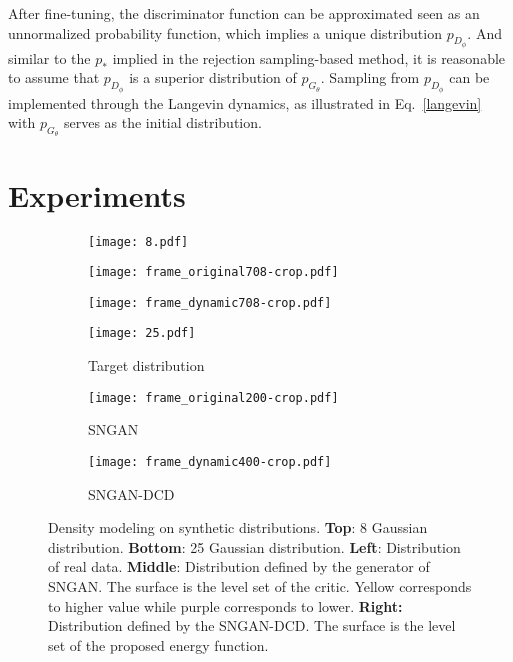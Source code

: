 \documentclass{article}
\begin{document}
After fine-tuning, the discriminator function can be approximated seen as an unnormalized probability function, which implies a unique distribution $p_{D_\phi}$. And similar to the $p_{*}$ implied in the rejection sampling-based method, it is reasonable to assume that $p_{D_\phi}$ is a superior distribution of $p_{G_\theta}$. Sampling from $p_{D_\phi}$ can be implemented through the Langevin dynamics, as illustrated in Eq.~\ref{langevin} with $p_{G_\theta}$ serves as the initial distribution.  


\section{Experiments}

\begin{figure*}[!t]
	\centering
	\begin{subfigure}{0.32\linewidth}
    	\texttt{[image: 8.pdf]} 
    \end{subfigure}
    \begin{subfigure}{0.32\linewidth}
		\texttt{[image: frame\_original708-crop.pdf]}
    \end{subfigure}
    \begin{subfigure}{0.32\linewidth}
		\texttt{[image: frame\_dynamic708-crop.pdf]}
    \end{subfigure}
    \begin{subfigure}{0.32\linewidth}
		\texttt{[image: 25.pdf]} 
        \caption{Target distribution}
        \label{subfig:toy:true}
    \end{subfigure}
    \begin{subfigure}{0.32\linewidth}
		\texttt{[image: frame\_original200-crop.pdf]}
        \caption{SNGAN}
        \label{subfig:toy:sngan}
    \end{subfigure}
    \begin{subfigure}{0.32\linewidth}
		\texttt{[image: frame\_dynamic400-crop.pdf]}
        \caption{SNGAN-DCD}
        \label{subfig:toy:sngan-dcd}
    \end{subfigure}
    \caption{Density modeling on synthetic distributions. \textbf{Top}: 8 Gaussian distribution. \textbf{Bottom}: 25 Gaussian distribution. \textbf{Left}: Distribution of real data. \textbf{Middle}: Distribution defined by the generator of SNGAN. The surface is the level set of the critic. Yellow corresponds to higher value while purple corresponds to lower. \textbf{Right:} Distribution defined by the SNGAN-DCD. The surface is the level set of the proposed energy function.}
    \vspace{-5pt}
    \label{fig:toy}
\end{figure*}
\end{document}
